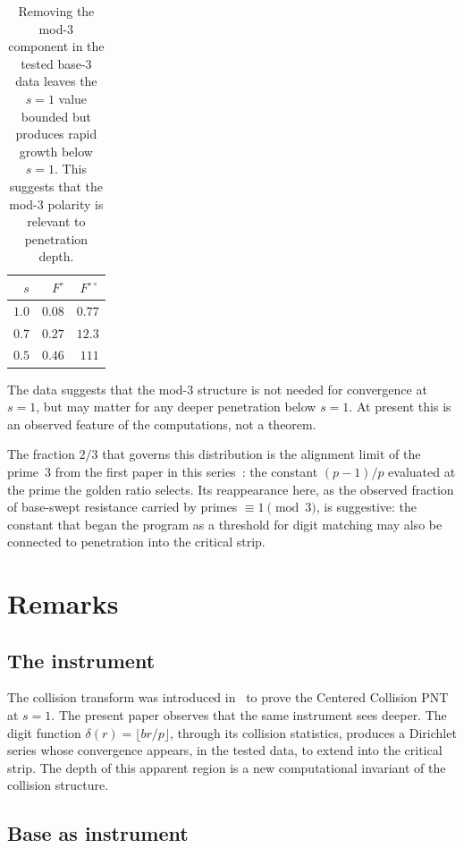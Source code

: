 \documentclass[12pt]{amsart}
\theoremstyle{definition}
\theoremstyle{remark}
\begin{document}
\begin{table}[h]
\centering
\begin{tabular}{rrr}
\toprule
$s$ & $F^{\circ}$ & $F^{\circ\circ}$ \\
\midrule
$1.0$ & $0.08$ & $0.77$ \\
$0.7$ & $0.27$ & $12.3$ \\
$0.5$ & $0.46$ & $111$ \\
\bottomrule
\end{tabular}
\caption{Removing the mod-$3$ component in the tested
base-$3$ data leaves the $s=1$ value bounded but produces
rapid growth below $s = 1$. This suggests that the
mod-$3$ polarity is relevant to penetration depth.}
\end{table}

The data suggests that the mod-$3$ structure is not needed
for convergence at $s = 1$, but may matter for any deeper
penetration below $s = 1$. At present this is an observed
feature of the computations, not a theorem.

The fraction $2/3$ that governs this distribution is
the alignment limit of the prime~$3$ from the first
paper in this series~\cite{paper1}: the constant
$(p{-}1)/p$ evaluated at the prime the golden ratio
selects. Its reappearance here, as the observed fraction
of base-swept resistance carried by primes
$\equiv 1 \pmod{3}$, is suggestive: the constant that
began the program as a threshold for digit matching may
also be connected to penetration into the critical strip.

\section{Remarks}

\subsection*{The instrument}

The collision transform was introduced
in~\cite{paper16} to prove the Centered Collision PNT at
$s = 1$. The present paper observes that the same instrument
sees deeper. The digit function
$\delta(r) = \lfloor br/p \rfloor$, through its collision
statistics, produces a Dirichlet series whose convergence
appears, in the tested data, to extend into the critical
strip. The depth of this apparent region is a new
computational invariant of the collision structure.

\subsection*{Base as instrument}
\end{document}
